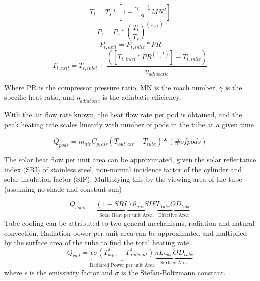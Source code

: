 \documentclass[heading.tex]{subfiles}
\begin{document}
\begin{equation}
T_{t} = T_{s} * [1 + \frac{\gamma -1}{2} MN^2]
\end{equation}
\begin{equation}
P_{t} = P_{s} * (\frac{ T_{t}}{T_{s}})^(\frac{\gamma}{\gamma -1})
\end{equation}
\begin{equation}
P_{t,exit} = P_{t,inlet} * PR
\end{equation}
\begin{equation}
T_{t,exit} = T_{t,inlet} + \frac{([T_{t,inlet}*PR^{(\frac{\gamma-1}{\gamma})}] - T_{t,inlet})}  {{\eta}_{adiabatic}}
\end{equation}

Where PR is the compressor pressure ratio, MN is the mach number,  $\gamma$ is the specific heat ratio, and  ${\eta}_{adiabatic}$ is the
adiabatic efficiency.

With the air flow rate known, the heat flow rate per pod is obtained, 
and the peak heating rate scales linearly with number of pods in the tube at a given time

\begin{equation}
{Q}_{pods}= \dot{m}_{air} C_{p,air} (T_{out, air} - T_{tube}) * (\#  of pods)
\end{equation}

The solar heat flow per unit area can be approximated, given the solar reflectance index (SRI) of stainless steel, non-normal incidence factor
of the cylinder and solar insulation factor (SIF).
Multiplying this by the viewing area of the tube (assuming no shade and constant sun)


\begin{equation}
Q_{solar} = \underbrace{ (1-SRI)  {\theta}_{nni}  SIF}_\text{Solar Heat per unit Area} \underbrace{L_{tube}  OD_{tube}}_\text{Effective Area}
\end{equation}
Tube cooling can be attributed to two general mechanisms, radiation and natural convection. Radiation power per unit area can be
approximated and multiplied by the surface area of the tube to find the total heating rate.
\begin{equation}
Q_{rad} = \underbrace{\epsilon \sigma (T_{pipe}^4 - T_{ambient}^4)}_\text{Radiated Power per unit Area}\underbrace{\pi L_{tube} OD_{tube}}_\text{Surface Area}
\end{equation}
where  $\epsilon$ is the emissivity factor and  $\sigma$ is the Stefan-Boltzmann constant.
\end{document}
